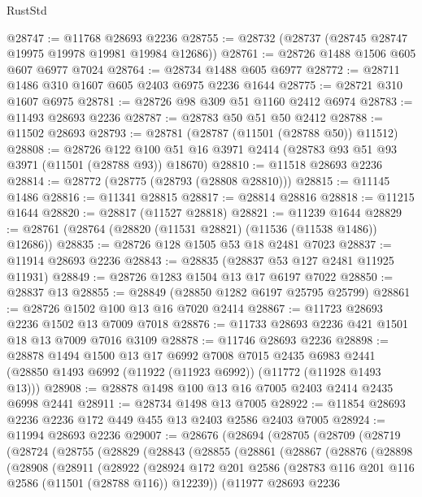 \begin{lexlean}{RustStd}
\begin{coremodule}
@28747 := @11768 @28693 @2236
@28755 := @28732 (@28737 (@28745 @28747 @19975 @19978 @19981 @19984 @12686))
@28761 := @28726 @1488 @1506 @605 @607 @6977 @7024
@28764 := @28734 @1488 @605 @6977
@28772 := @28711 @1486 @310 @1607 @605 @2403 @6975 @2236 @1644
@28775 := @28721 @310 @1607 @6975
@28781 := @28726 @98 @309 @51 @1160 @2412 @6974
@28783 := @11493 @28693 @2236
@28787 := @28783 @50 @51 @50 @2412
@28788 := @11502 @28693
@28793 := @28781 (@28787 (@11501 (@28788 @50)) @11512)
@28808 := @28726
    @122
    @100
    @51
    @16
    @3971
    @2414
    (@28783 @93 @51 @93 @3971 (@11501 (@28788 @93)) @18670)
@28810 := @11518 @28693 @2236
@28814 := @28772 (@28775 (@28793 (@28808 @28810)))
@28815 := @11145 @1486
@28816 := @11341 @28815
@28817 := @28814 @28816
@28818 := @11215 @1644
@28820 := @28817 (@11527 @28818)
@28821 := @11239 @1644
@28829 := @28761 (@28764 (@28820 (@11531 @28821) (@11536 (@11538 @1486)) @12686))
@28835 := @28726 @128 @1505 @53 @18 @2481 @7023
@28837 := @11914 @28693 @2236
@28843 := @28835 (@28837 @53 @127 @2481 @11925 @11931)
@28849 := @28726 @1283 @1504 @13 @17 @6197 @7022
@28850 := @28837 @13
@28855 := @28849 (@28850 @1282 @6197 @25795 @25799)
@28861 := @28726 @1502 @100 @13 @16 @7020 @2414
@28867 := @11723 @28693 @2236 @1502 @13 @7009 @7018
@28876 := @11733 @28693 @2236 @421 @1501 @18 @13 @7009 @7016 @3109
@28878 := @11746 @28693 @2236
@28898 := @28878
    @1494
    @1500
    @13
    @17
    @6992
    @7008
    @7015
    @2435
    @6983
    @2441
    (@28850 @1493 @6992 (@11922 (@11923 @6992)) (@11772 (@11928 @1493 @13)))
@28908 := @28878 @1498 @100 @13 @16 @7005 @2403 @2414 @2435 @6998 @2441
@28911 := @28734 @1498 @13 @7005
@28922 := @11854 @28693 @2236 @2236 @172 @449 @455 @13 @2403 @2586 @2403 @7005
@28924 := @11994 @28693 @2236
@29007 := @28676
    (@28694
      (@28705
        (@28709
          (@28719
            (@28724
              (@28755
                (@28829
                  (@28843
                    (@28855
                      (@28861
                        (@28867
                          (@28876
                            (@28898
                              (@28908
                                (@28911
                                  (@28922
                                    (@28924
                                      @172
                                      @201
                                      @2586
                                      (@28783 @116 @201 @116 @2586 (@11501 (@28788 @116)) @12239))
                                    (@11977
                                      @28693
                                      @2236

\end{coremodule}
\end{lexlean}
